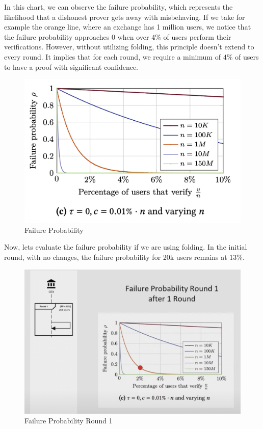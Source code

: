 In this chart, we can observe the failure probability, which represents the likelihood that a dishonest prover gets away with misbehaving.
If we take for example the orange line, where an exchange has 1 million users, we notice that the failure probability approaches 0 when over $4\%$ of users perform their verifications.
However, without utilizing folding, this principle doesn't extend to every round. It implies that for each round, we require a minimum of $4\%$ of users to have a proof with significant confidence.

\begin{figure}[H]
   \centering
   \includegraphics[width=130mm]{FailureProbability.png}
   \caption{Failure Probability \cite{GP21}}
   \label{overflow}
   \end{figure}

Now, lets evaluate the failure probability if we are using folding.
In the initial round, with no changes, the failure probability for 20k users remains at $13\%$.

\begin{figure}[H]
   \centering
   \includegraphics[width=130mm]{FailureProbabilityRound1.png}
   \caption{Failure Probability Round 1 \cite{NS23}}
   \label{overflow}
   \end{figure}

